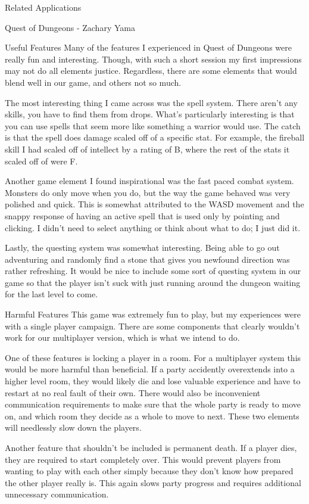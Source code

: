 \documentclass[12pt]{report}
\begin{document}
\begin{section}{Related Applications}
\begin{subsection}{Quest of Dungeons - Zachary Yama}
\begin{subsubsection}{Useful Features}
Many of the features I experienced in Quest of Dungeons were really fun and
interesting. Though, with such a short session my first impressions may not
do all elements justice. Regardless, there are some elements that would
blend well in our game, and others not so much.
 
The most interesting thing I came across was the spell system. There aren’t
any skills, you have to find them from drops. What’s particularly
interesting is that you can use spells that seem more like something a
warrior would use. The catch is that the spell does damage scaled off of a
specific stat. For example, the fireball skill I had scaled off of
intellect by a rating of B, where the rest of the stats it scaled off of
were F.
 
Another game element I found inspirational was the fast paced combat
system. Monsters do only move when you do, but the way the game behaved was
very polished and quick. This is somewhat attributed to the WASD movement
and the snappy response of having an active spell that is used only by
pointing and clicking. I didn’t need to select anything or think about what
to do; I just did it.

Lastly, the questing system was somewhat interesting. Being able to go out
adventuring and randomly find a stone that gives you newfound direction was
rather refreshing. It would be nice to include some sort of questing system
in our game so that the player isn’t suck with just running around the
dungeon waiting for the last level to come.  
\end{subsubsection}
 
\begin{subsubsection}{Harmful Features}
This game was extremely fun to play, but my experiences were with a single
player campaign. There are some components that clearly wouldn’t work for
our multiplayer version, which is what we intend to do.
 
One of these features is locking a player in a room. For a multiplayer
system this would be more harmful than beneficial. If a party accidently
overextends into a higher level room, they would likely die and 
lose valuable experience and have to restart at no real fault of their own.
There would also be inconvenient communication requirements to make sure
that the whole party is ready to move on, and which room they decide as a
whole to move to next. These two elements will needlessly slow down the
players.
 
Another feature that shouldn’t be included is permanent death. If a player
dies, they are required to start completely over. This would prevent
players from wanting to play with each other simply because they don’t
know how prepared the other player really is. This again slows party
progress and requires additional unnecessary communication.
\end{subsubsection}
\end{subsection}
\end{section}
\end{document}
